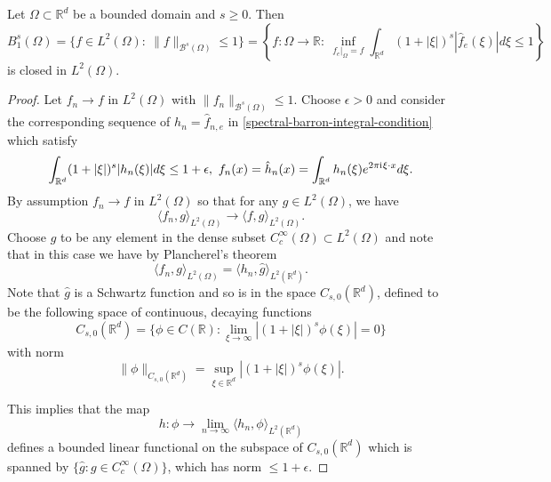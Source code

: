 \begin{proposition}
 Let $\Omega\subset \mathbb{R}^d$ be a bounded domain and $s \geq 0$. Then
 \begin{equation}
 B_1^s(\Omega) = \{f\in L^2(\Omega):~\|f\|_{\mathcal{B}^s(\Omega)}\leq 1\} = \left\{f:\Omega\rightarrow \mathbb{R}:~\inf_{f_e|_\Omega = f} \int_{\mathbb{R}^d} (1+|\xi|)^s|\hat{f}_e(\xi)|d\xi\leq 1\right\}
\end{equation}
is closed in $L^2(\Omega)$.
\end{proposition}
\begin{proof}
 Let $f_n\rightarrow f$ in $L^2(\Omega)$ with $\|f_n\|_{\mathcal{B}^s(\Omega)} \leq 1$. Choose $\epsilon > 0$ and consider the corresponding sequence of $h_n = \hat{f}_{n,e}$ in \eqref{spectral-barron-integral-condition} which satisfy
 \begin{equation}
  \int_{\mathbb{R}^d}(1+|\xi|)^s|h_n(\xi)|d\xi \leq 1 + \epsilon,~f_n(x)=\hat{h}_n(x) = \int_{\mathbb{R}^d} h_n(\xi)e^{2\pi {\mathrm{i}\mkern1mu} \xi\cdot x}d\xi.
 \end{equation}
 By assumption $f_n\rightarrow f$ in $L^2(\Omega)$ so that for any $g\in L^2(\Omega)$, we have
 \begin{equation}
  \langle f_n, g\rangle_{L^2(\Omega)} \rightarrow \langle f, g\rangle_{L^2(\Omega)}.
 \end{equation}
 Choose $g$ to be any element in the dense subset $C^\infty_c(\Omega)\subset L^2(\Omega)$ and note that in this case we have by Plancherel's theorem
 \begin{equation}
  \langle f_n, g\rangle_{L^2(\Omega)} = \langle h_n, \hat{g}\rangle_{L^2(\mathbb{R}^d)}.
 \end{equation}
 Note that $\hat{g}$ is a Schwartz function and so is in the space $C_{s,0}(\mathbb{R}^d)$, defined to be the following space of continuous, decaying functions
 \begin{equation}
  C_{s,0}(\mathbb{R}^d) = \{\phi\in C(\mathbb{R}):\lim_{\xi\rightarrow \infty} |(1+|\xi|)^s\phi(\xi)| = 0\}
 \end{equation}
 with norm
 \begin{equation}
  \|\phi\|_{C_{s,0}(\mathbb{R}^d)} = \sup_{\xi\in \mathbb{R}^d} |(1+|\xi|)^s\phi(\xi)|.
 \end{equation}
 
 This implies that the map
 \begin{equation}
  h:\phi \rightarrow \lim_{n\rightarrow \infty}\langle h_n, \phi\rangle_{L^2(\mathbb{R}^d)} 
 \end{equation}
 defines a bounded linear functional on the subspace of $C_{s,0}(\mathbb{R}^d)$ which is spanned by $\{\hat{g}:g\in C^\infty_c(\Omega)\}$, which has norm $\leq 1 + \epsilon$. 
 

\end{proof}
